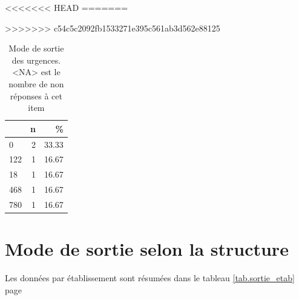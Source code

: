 \documentclass[12pt,english,french,twoside]{book}\usepackage[]{graphicx}\usepackage[]{color}
\makeatletter
\newenvironment{kframe}{%
 \def\at@end@of@kframe{}%
 \ifinner\ifhmode%
  \def\at@end@of@kframe{\end{minipage}}%
  \begin{minipage}{\columnwidth}%
 \fi\fi%
 \def\FrameCommand##1{\hskip\@totalleftmargin \hskip-\fboxsep
 \colorbox{shadecolor}{##1}\hskip-\fboxsep
     \hskip-\linewidth \hskip-\@totalleftmargin \hskip\columnwidth}%
 \MakeFramed {\advance\hsize-\width
   \@totalleftmargin\z@ \linewidth\hsize
   \@setminipage}}%
 {\par\unskip\endMakeFramed%
 \at@end@of@kframe}
\makeatother
\begin{document}
<<<<<<< HEAD
=======
\begin{kframe}


{\ttfamily\noindent\bfseries{}}\end{kframe}%
>>>>>>> c54c5c2092fb1533271e395c561ab3d562e88125
\begin{table}[ht]
\centering
\begin{tabular}{|l|r|r|}
  \hline
 & n & \% \\ 
  \hline
0 & 2 & 33.33 \\ 
  122 & 1 & 16.67 \\ 
  18 & 1 & 16.67 \\ 
  468 & 1 & 16.67 \\ 
  780 & 1 & 16.67 \\ 
   \hline
\end{tabular}
\caption[Mode de sortie des urgences]{Mode de sortie des urgences. <NA> est le nombre de non réponses à cet item} 
\label{tab.sortie}
\end{table}



\section{Mode de sortie selon la structure}

Les données par établissement sont résumées dans le tableau \ref{tab.sortie_etab} page \pageref{tab.sortie_etab}
\end{document}
